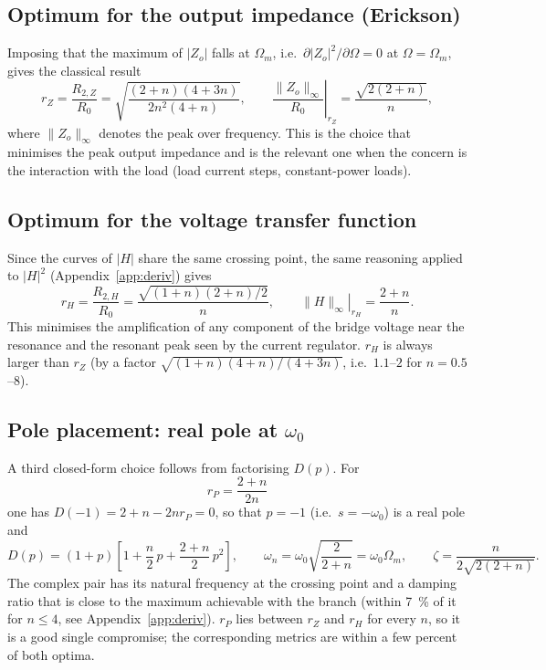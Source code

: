 \documentclass[11pt,a4paper]{article}
\begin{document}
\subsection{Optimum for the output impedance (Erickson)}
\label{sec:optZo}

Imposing that the maximum of $|Z_o|$ falls at $\Omega_m$, i.e.\
$\partial |Z_o|^2/\partial\Omega = 0$ at $\Omega = \Omega_m$, gives the classical result
\cite{Erickson1999,EricksonBook}
\begin{equation}
r_Z = \frac{R_{2,Z}}{R_0} = \sqrt{\frac{(2+n)(4+3n)}{2 n^2 (4+n)}}, \qquad
\left.\frac{\|Z_o\|_\infty}{R_0}\right|_{r_Z} = \frac{\sqrt{2(2+n)}}{n},
\label{eq:rZ}
\end{equation}
where $\|Z_o\|_\infty$ denotes the peak over frequency. This is the choice that minimises
the peak output impedance and is the relevant one when the concern is the interaction
with the load (load current steps, constant-power loads).

\subsection{Optimum for the voltage transfer function}
\label{sec:optH}

Since the curves of $|H|$ share the same crossing point, the same reasoning applied to
$|H|^2$ (Appendix~\ref{app:deriv}) gives
\begin{equation}
r_H = \frac{R_{2,H}}{R_0} = \frac{\sqrt{(1+n)(2+n)/2}}{n}, \qquad
\left.\|H\|_\infty\right|_{r_H} = \frac{2+n}{n}.
\label{eq:rH}
\end{equation}
This minimises the amplification of any component of the bridge voltage near the
resonance and the resonant peak seen by the current regulator. $r_H$ is always larger
than $r_Z$ (by a factor $\sqrt{(1+n)(4+n)/(4+3n)}$, i.e.\ $1.1$--$2$ for $n = 0.5$--$8$).

\subsection{Pole placement: real pole at \texorpdfstring{$\omega_0$}{w0}}
\label{sec:optP}

A third closed-form choice follows from factorising $D(p)$. For
\begin{equation}
r_P = \frac{2+n}{2n}
\label{eq:rP}
\end{equation}
one has $D(-1) = 2 + n - 2 n r_P = 0$, so that $p = -1$ (i.e.\ $s = -\omega_0$) is a
real pole and
\begin{equation}
D(p) = (1 + p)\left[1 + \frac{n}{2}\,p + \frac{2+n}{2}\,p^2\right],
\qquad
\omega_n = \omega_0 \sqrt{\frac{2}{2+n}} = \omega_0 \Omega_m,
\qquad
\zeta = \frac{n}{2\sqrt{2(2+n)}}.
\label{eq:zetaP}
\end{equation}
The complex pair has its natural frequency at the crossing point and a damping ratio that
is close to the maximum achievable with the branch (within \SI{7}{\percent} of it for
$n \le 4$, see Appendix~\ref{app:deriv}). $r_P$ lies between $r_Z$ and $r_H$ for every $n$, so it is a good single
compromise; the corresponding metrics are within a few percent of both optima.
\end{document}
